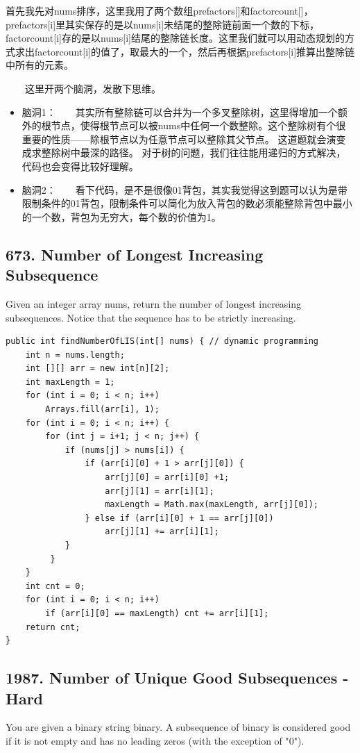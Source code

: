\documentclass[9pt, b5paaper]{book}
\begin{document}
\begin{enumerate}
首先我先对nums排序，这里我用了两个数组prefactors[]和factorcount[]，prefactors[i]里其实保存的是以nums[i]未结尾的整除链前面一个数的下标，factorcount[i]存的是以nums[i]结尾的整除链长度。这里我们就可以用动态规划的方式求出factorcount[i]的值了，取最大的一个，然后再根据prefactors[i]推算出整除链中所有的元素。

　　这里开两个脑洞，发散下思维。

\begin{itemize}
\item 脑洞1：　　其实所有整除链可以合并为一个多叉整除树，这里得增加一个额外的根节点，使得根节点可以被nums中任何一个数整除。这个整除树有个很重要的性质——除根节点以为任意节点可以整除其父节点。 这道题就会演变成求整除树中最深的路径。 对于树的问题，我们往往能用递归的方式解决，代码也会变得比较好理解。
\item 脑洞2：　　看下代码，是不是很像01背包，其实我觉得这到题可以认为是带限制条件的01背包，限制条件可以简化为放入背包的数必须能整除背包中最小的一个数，背包为无穷大，每个数的价值为1。
\end{itemize}
\end{enumerate}

\subsection{673. Number of Longest Increasing Subsequence}
\label{sec-1-4-19}
Given an integer array nums, return the number of longest increasing subsequences.
Notice that the sequence has to be strictly increasing.
\begin{verbatim}
public int findNumberOfLIS(int[] nums) { // dynamic programming
    int n = nums.length;
    int [][] arr = new int[n][2];
    int maxLength = 1;
    for (int i = 0; i < n; i++) 
        Arrays.fill(arr[i], 1);
    for (int i = 0; i < n; i++) {
        for (int j = i+1; j < n; j++) {
            if (nums[j] > nums[i]) {
                if (arr[i][0] + 1 > arr[j][0]) {
                    arr[j][0] = arr[i][0] +1;
                    arr[j][1] = arr[i][1];
                    maxLength = Math.max(maxLength, arr[j][0]);
                } else if (arr[i][0] + 1 == arr[j][0])
                    arr[j][1] += arr[i][1];
            }
         }
    }
    int cnt = 0;
    for (int i = 0; i < n; i++) 
        if (arr[i][0] == maxLength) cnt += arr[i][1];
    return cnt;
}
\end{verbatim}

\subsection{1987. Number of Unique Good Subsequences - Hard}
\label{sec-1-4-20}
You are given a binary string binary. A subsequence of binary is considered good if it is not empty and has no leading zeros (with the exception of "0").
\end{document}

